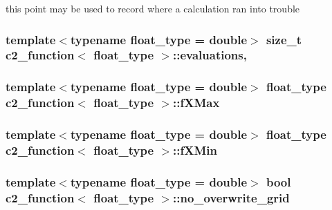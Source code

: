 this point may be used to record where a calculation ran into trouble 

\subsubsection[{\texorpdfstring{evaluations}{evaluations}}]{\setlength{\rightskip}{0pt plus 5cm}template$<$typename float\+\_\+type = double$>$ size\+\_\+t {\bf c2\+\_\+function}$<$ float\+\_\+type $>$\+::evaluations\hspace{0.3cm}{\ttfamily [mutable]}, {\ttfamily [protected]}}\hypertarget{classc2__function_a0737663eb36818cd357852479e6b96f2}{}\label{classc2__function_a0737663eb36818cd357852479e6b96f2}
\subsubsection[{\texorpdfstring{f\+X\+Max}{fXMax}}]{\setlength{\rightskip}{0pt plus 5cm}template$<$typename float\+\_\+type = double$>$ float\+\_\+type {\bf c2\+\_\+function}$<$ float\+\_\+type $>$\+::f\+X\+Max\hspace{0.3cm}{\ttfamily [protected]}}\hypertarget{classc2__function_a8d000a2d3ca13a119f4bcf4e31a9bca6}{}\label{classc2__function_a8d000a2d3ca13a119f4bcf4e31a9bca6}
\subsubsection[{\texorpdfstring{f\+X\+Min}{fXMin}}]{\setlength{\rightskip}{0pt plus 5cm}template$<$typename float\+\_\+type = double$>$ float\+\_\+type {\bf c2\+\_\+function}$<$ float\+\_\+type $>$\+::f\+X\+Min\hspace{0.3cm}{\ttfamily [protected]}}\hypertarget{classc2__function_a72d60216e8a9c61039d4895c6a15b0ce}{}\label{classc2__function_a72d60216e8a9c61039d4895c6a15b0ce}
\subsubsection[{\texorpdfstring{no\+\_\+overwrite\+\_\+grid}{no_overwrite_grid}}]{\setlength{\rightskip}{0pt plus 5cm}template$<$typename float\+\_\+type = double$>$ bool {\bf c2\+\_\+function}$<$ float\+\_\+type $>$\+::no\+\_\+overwrite\+\_\+grid\hspace{0.3cm}{\ttfamily [protected]}}\hypertarget{classc2__function_a12085ddfc5716c442bb59c5672e140dd}{}\label{classc2__function_a12085ddfc5716c442bb59c5672e140dd}
